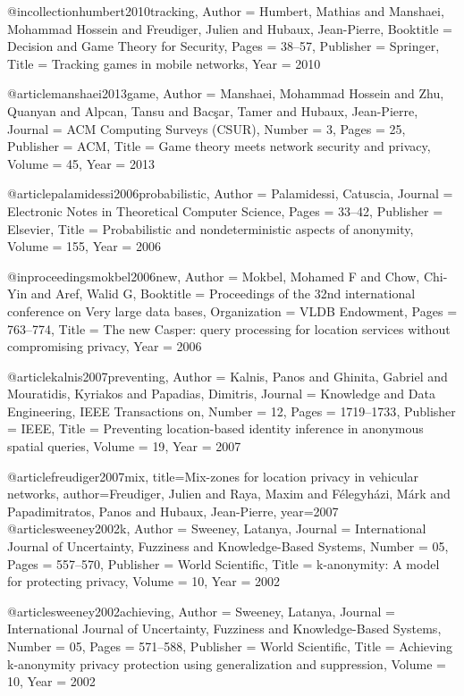 {{{{{	@incollection{humbert2010tracking,
	Author = {Humbert, Mathias and Manshaei, Mohammad Hossein and Freudiger, Julien and Hubaux, Jean-Pierre},
	Booktitle = {Decision and Game Theory for Security},
	Pages = {38--57},
	Publisher = {Springer},
	Title = {Tracking games in mobile networks},
	Year = {2010}}
	
	@article{manshaei2013game,
	Author = {Manshaei, Mohammad Hossein and Zhu, Quanyan and Alpcan, Tansu and Bac{\c{s}}ar, Tamer and Hubaux, Jean-Pierre},
	Journal = {ACM Computing Surveys (CSUR)},
	Number = {3},
	Pages = {25},
	Publisher = {ACM},
	Title = {Game theory meets network security and privacy},
	Volume = {45},
	Year = {2013}}
	
	@article{palamidessi2006probabilistic,
	Author = {Palamidessi, Catuscia},
	Journal = {Electronic Notes in Theoretical Computer Science},
	Pages = {33--42},
	Publisher = {Elsevier},
	Title = {Probabilistic and nondeterministic aspects of anonymity},
	Volume = {155},
	Year = {2006}}
	
	@inproceedings{mokbel2006new,
	Author = {Mokbel, Mohamed F and Chow, Chi-Yin and Aref, Walid G},
	Booktitle = {Proceedings of the 32nd international conference on Very large data bases},
	Organization = {VLDB Endowment},
	Pages = {763--774},
	Title = {The new Casper: query processing for location services without compromising privacy},
	Year = {2006}}
	
	@article{kalnis2007preventing,
	Author = {Kalnis, Panos and Ghinita, Gabriel and Mouratidis, Kyriakos and Papadias, Dimitris},
	Journal = {Knowledge and Data Engineering, IEEE Transactions on},
	Number = {12},
	Pages = {1719--1733},
	Publisher = {IEEE},
	Title = {Preventing location-based identity inference in anonymous spatial queries},
	Volume = {19},
	Year = {2007}}
	
	@article{freudiger2007mix,
	title={Mix-zones for location privacy in vehicular networks},
	author={Freudiger, Julien and Raya, Maxim and F{\'e}legyh{\'a}zi, M{\'a}rk and Papadimitratos, Panos and Hubaux, Jean-Pierre},
	year={2007}
	}
	@article{sweeney2002k,
	Author = {Sweeney, Latanya},
	Journal = {International Journal of Uncertainty, Fuzziness and Knowledge-Based Systems},
	Number = {05},
	Pages = {557--570},
	Publisher = {World Scientific},
	Title = {k-anonymity: A model for protecting privacy},
	Volume = {10},
	Year = {2002}}
	
	@article{sweeney2002achieving,
	Author = {Sweeney, Latanya},
	Journal = {International Journal of Uncertainty, Fuzziness and Knowledge-Based Systems},
	Number = {05},
	Pages = {571--588},
	Publisher = {World Scientific},
	Title = {Achieving k-anonymity privacy protection using generalization and suppression},
	Volume = {10},
	Year = {2002}}
	
}}}}}
